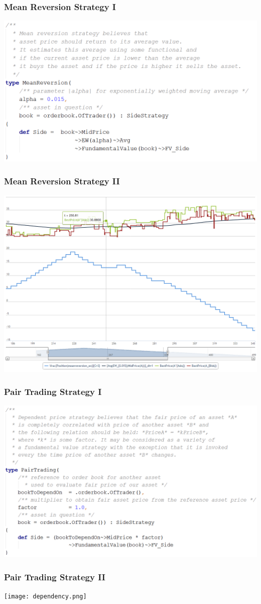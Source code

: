 \documentclass{beamer}
\begin{document}
\begin{frame}
\frametitle{Mean Reversion Strategy I}
\includegraphics[width=1\linewidth]{meanreversion_strategy.png}
\end{frame}
\begin{frame}
\frametitle{Mean Reversion Strategy II}
\includegraphics[width=1\linewidth]{meanreversion.png}
\end{frame}
\begin{frame}
\frametitle{Pair Trading Strategy I}
\includegraphics[width=1\linewidth]{dependency_strategy.png}
\end{frame}
\begin{frame}
\frametitle{Pair Trading Strategy II}
\texttt{[image: dependency.png]}
\end{frame}
\end{document}
